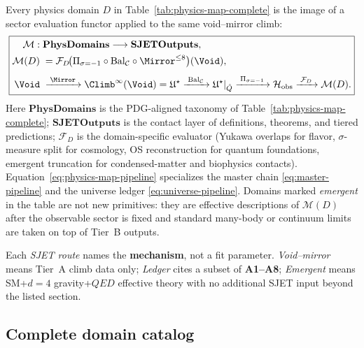 Every physics domain $D$ in Table~\ref{tab:physics-map-complete} is the image of
a sector evaluation functor applied to the same void--mirror climb:
\begin{equation}\label{eq:physics-map-pipeline}
  \boxed{%
  \begin{aligned}
    \mathcal{M}:\;&\mathbf{PhysDomains}\longrightarrow\mathbf{SJETOutputs},\\
    \mathcal{M}(D)\;&=\mathcal{F}_D\!\bigl(
      \Pi_{\sigma=-1}\circ\mathrm{Bal}_{\mathcal{C}}\circ\Mirror^{\leq 8}
    \bigr)(\Void),\\[4pt]
    \Void\;&\xrightarrow{\;\Mirror\;}
    \Climb^\infty(\Void)=\mathfrak{U}^\star
    \xrightarrow{\;\mathrm{Bal}_{\mathcal{C}}\;}
    \mathfrak{U}^\star|_{\hat Q}
    \xrightarrow{\;\Pi_{\sigma=-1}\;}
    \mathcal{H}_{\mathrm{obs}}
    \xrightarrow{\;\mathcal{F}_D\;}
    \mathcal{M}(D).
  \end{aligned}}
\end{equation}
Here $\mathbf{PhysDomains}$ is the PDG-aligned taxonomy of
Table~\ref{tab:physics-map-complete}; $\mathbf{SJETOutputs}$ is the contact
layer of definitions, theorems, and tiered predictions; $\mathcal{F}_D$ is the
domain-specific evaluator (Yukawa overlaps for flavor, $\sigma$-measure split
for cosmology, OS reconstruction for quantum foundations, emergent truncation for
condensed-matter and biophysics contacts). Equation~\eqref{eq:physics-map-pipeline}
specializes the master chain \eqref{eq:master-pipeline} and the universe ledger
\eqref{eq:universe-pipeline}. Domains marked \emph{emergent} in the table are
not new primitives: they are effective descriptions of $\mathcal{M}(D)$ after
the observable sector is fixed and standard many-body or continuum limits are
taken on top of Tier~B outputs.

\begin{remark}
Each \emph{SJET route} names the \textbf{mechanism}, not a fit parameter.
\emph{Void--mirror} means Tier~A climb data only;
\emph{Ledger} cites a subset of \textbf{A1--A8};
\emph{Emergent} means SM+$d=4$ gravity+$QED$ effective theory with no additional
SJET input beyond the listed section.
\end{remark}

\subsection{Complete domain catalog}
\label{sec:physics-map:table}

